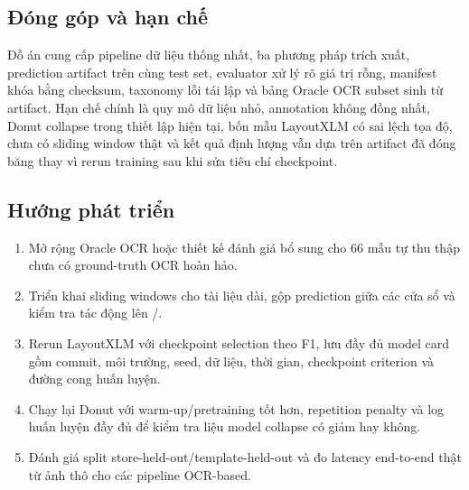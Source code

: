 \subsection{Đóng góp và hạn chế}
\label{subsec:limitations}

Đồ án cung cấp pipeline dữ liệu thống nhất, ba phương pháp trích xuất, prediction artifact trên cùng test set, evaluator xử lý rõ giá trị rỗng, manifest khóa bằng checksum, taxonomy lỗi tái lập và bảng Oracle OCR subset sinh từ artifact. Hạn chế chính là quy mô dữ liệu nhỏ, annotation không đồng nhất, Donut collapse trong thiết lập hiện tại, bốn mẫu LayoutXLM có sai lệch tọa độ, chưa có sliding window thật và kết quả định lượng vẫn dựa trên artifact đã đóng băng thay vì rerun training sau khi sửa tiêu chí checkpoint.

\subsection{Hướng phát triển}
\label{subsec:future_work}

\begin{enumerate}
  \item Mở rộng Oracle OCR hoặc thiết kế đánh giá bổ sung cho 66 mẫu tự thu thập chưa có ground-truth OCR hoàn hảo.
  \item Triển khai sliding windows cho tài liệu dài, gộp prediction giữa các cửa sổ và kiểm tra tác động lên /.
  \item Rerun LayoutXLM với checkpoint selection theo F1, lưu đầy đủ model card gồm commit, môi trường, seed, dữ liệu, thời gian, checkpoint criterion và đường cong huấn luyện.
  \item Chạy lại Donut với warm-up/pretraining tốt hơn, repetition penalty và log huấn luyện đầy đủ để kiểm tra liệu model collapse có giảm hay không.
  \item Đánh giá split store-held-out/template-held-out và đo latency end-to-end thật từ ảnh thô cho các pipeline OCR-based.
\end{enumerate}